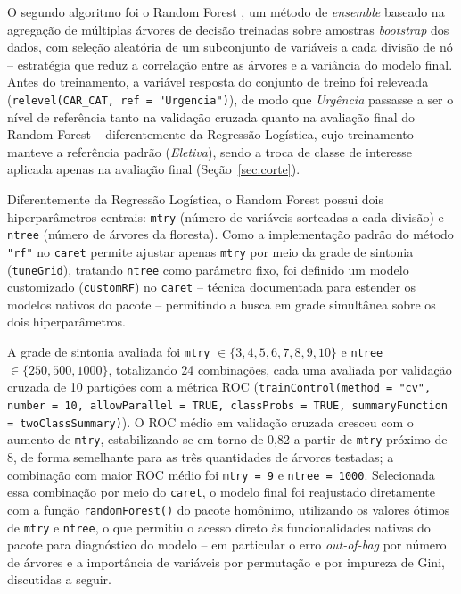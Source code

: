 \documentclass[12pt,a4paper]{article}
\begin{document}
O segundo algoritmo foi o Random Forest \cite{breiman2001,liaw2002}, um método de \textit{ensemble} baseado na agregação de múltiplas árvores de decisão treinadas sobre amostras \textit{bootstrap} dos dados, com seleção aleatória de um subconjunto de variáveis a cada divisão de nó -- estratégia que reduz a correlação entre as árvores e a variância do modelo final. Antes do treinamento, a variável resposta do conjunto de treino foi releveada (\texttt{relevel(CAR\_CAT, ref = "Urgencia")}), de modo que \emph{Urgência} passasse a ser o nível de referência tanto na validação cruzada quanto na avaliação final do Random Forest -- diferentemente da Regressão Logística, cujo treinamento manteve a referência padrão (\emph{Eletiva}), sendo a troca de classe de interesse aplicada apenas na avaliação final (Seção~\ref{sec:corte}).

Diferentemente da Regressão Logística, o Random Forest possui dois hiperparâmetros centrais: \texttt{mtry} (número de variáveis sorteadas a cada divisão) e \texttt{ntree} (número de árvores da floresta). Como a implementação padrão do método \texttt{"rf"} no \texttt{caret} permite ajustar apenas \texttt{mtry} por meio da grade de sintonia (\texttt{tuneGrid}), tratando \texttt{ntree} como parâmetro fixo, foi definido um modelo customizado (\texttt{customRF}) no \texttt{caret} -- técnica documentada para estender os modelos nativos do pacote \cite{kuhn2008} -- permitindo a busca em grade simultânea sobre os dois hiperparâmetros.

A grade de sintonia avaliada foi \texttt{mtry} $\in \{3,4,5,6,7,8,9,10\}$ e \texttt{ntree} $\in \{250, 500, 1000\}$, totalizando 24 combinações, cada uma avaliada por validação cruzada de 10 partições com a métrica ROC (\texttt{trainControl(method = "cv", number = 10, allowParallel = TRUE, classProbs = TRUE, summaryFunction = twoClassSummary)}). O ROC médio em validação cruzada cresceu com o aumento de \texttt{mtry}, estabilizando-se em torno de 0,82 a partir de \texttt{mtry} próximo de 8, de forma semelhante para as três quantidades de árvores testadas; a combinação com maior ROC médio foi \texttt{mtry = 9} e \texttt{ntree = 1000}. Selecionada essa combinação por meio do \texttt{caret}, o modelo final foi reajustado diretamente com a função \texttt{randomForest()} do pacote homônimo, utilizando os valores ótimos de \texttt{mtry} e \texttt{ntree}, o que permitiu o acesso direto às funcionalidades nativas do pacote para diagnóstico do modelo -- em particular o erro \textit{out-of-bag} por número de árvores e a importância de variáveis por permutação e por impureza de Gini, discutidas a seguir.
\end{document}
